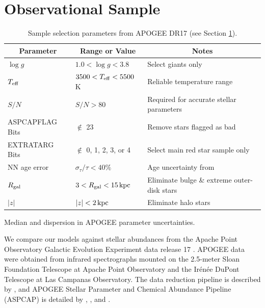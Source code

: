 \documentclass[twocolumn,twocolappendix,linenumbers]{aastex631}
\newcommand{\kpc}{\,{\rm kpc}}
\begin{document}
\section{Observational Sample}
\label{sec:observational-sample}

\begin{table}
    \centering
    \caption{Sample selection parameters from APOGEE DR17 (see Section \ref{sec:observational-sample}).}
    \label{tab:sample}
    \begin{tabular}{lll}
        \hline\hline
        \multicolumn{1}{c}{Parameter} & \multicolumn{1}{c}{Range or Value} & \multicolumn{1}{c}{Notes} \\
        \hline
        $\log g$            & $1.0 < \log g < 3.8$          & Select giants only \\
        $T_{\rm eff}$       & $3500 < T_{\rm eff} < 5500$ K & Reliable temperature range \\
        $S/N$               & $S/N > 80$                    & Required for accurate stellar parameters \\
        ASPCAPFLAG Bits     & $\notin$ 23                   & Remove stars flagged as bad \\
        EXTRATARG Bits      & $\notin$ 0, 1, 2, 3, or 4     & Select main red star sample only \\
        NN age error        & $\sigma_\tau/\tau < 40\%$     & Age uncertainty from \citet{leung_variational_2023} \\
        $R_{\rm gal}$     & $3 < R_{\rm gal} < 15\kpc$    & Eliminate bulge \& extreme outer-disk stars \\
        $|z|$               & $|z| < 2\kpc$                 & Eliminate halo stars \\
        \hline
    \end{tabular}
\end{table}

\begin{table}
    \centering
    \caption{Median and dispersion in APOGEE parameter uncertainties.}
    \label{tab:uncertainties}
    
\end{table}

% 

We compare our models against stellar abundances from the Apache Point Observatory Galactic Evolution Experiment \citep[APOGEE;][]{majewski_apache_2017} data release 17 \citep[DR17;][]{abdurrouf_seventeenth_2022}. APOGEE data were obtained from infrared spectrographs \citep{wilson_apache_2019} mounted on the 2.5-meter Sloan Foundation Telescope \citep{gunn_25_2006} at Apache Point Observatory and the Ir{\'e}n{\'e}e DuPont Telescope \citep{bowen_optical_1973} at Las Campanas Observatory. The data reduction pipeline is described by \citet{nidever_data_2015}, and APOGEE Stellar Parameter and Chemical Abundance Pipeline (ASPCAP) is detailed by \citet{holtzman_abundances_2015}, \citet{garcia_perez_aspcap_2016}, and \citet{jonsson_apogee_2020}.
\end{document}

